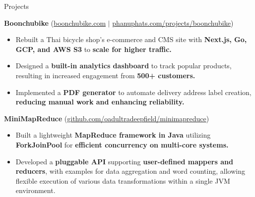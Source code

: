 \documentclass{phanuphat_srisukhawasu_resume} %
\begin{document}

\begin{rSection}{Projects}

  \textbf{Boonchubike} (\href{https://boonchubike.com}{boonchubike.com} $|$ \href{https://phanuphats.com/projects/boonchubike}{phanuphats.com/projects/boonchubike})
  \begin{itemize}
    \item Rebuilt a Thai bicycle shop's e-commerce and CMS site with \textbf{Next.js, Go, GCP, and AWS S3} to \textbf{scale for higher traffic.} 
    \item Designed a \textbf{built-in analytics dashboard} to track popular products, resulting in increased engagement from \textbf{500+ customers.}
    \item Implemented a \textbf{PDF generator} to automate delivery address label creation, \textbf{reducing manual work and enhancing reliability.}
  \end{itemize}

  \textbf{MiniMapReduce} (\href{https://github.com/oadultradeepfield/minimapreduce}{github.com/oadultradeepfield/minimapreduce})
  \begin{itemize}
    \item Built a lightweight \textbf{MapReduce framework in Java} utilizing \textbf{ForkJoinPool} for \textbf{efficient concurrency on multi-core systems.}
    \item Developed a \textbf{pluggable API} supporting \textbf{user-defined mappers and reducers}, with examples for data aggregation and word counting, allowing flexible execution of various data transformations within a single JVM environment.
  \end{itemize}

\end{rSection}


\end{document}
